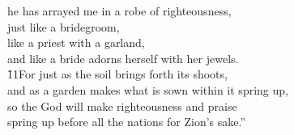 \begin{poetry}
\poemll    he has arrayed me in a robe of righteousness, \\
\poeml just like a bridegroom, \\
\poemll    like a priest with a garland, \\
\poemlll       and like a bride adorns herself with her jewels. \\
\poeml \v{11}For just as the soil brings forth its shoots, \\
\poemll    and as a garden makes what is sown within it spring up, \\
\poeml so the  God will make righteousness and praise \\
\poemll    spring up before all the nations for Zion's sake.''
\end{poetry}

